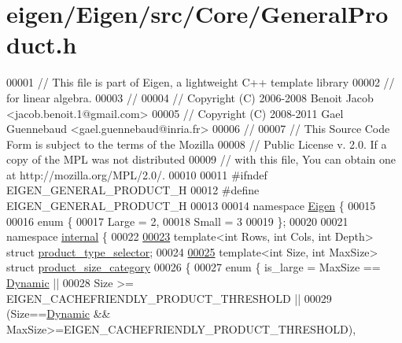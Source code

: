 \hypertarget{eigen_2_eigen_2src_2_core_2_general_product_8h_source}{}\section{eigen/\+Eigen/src/\+Core/\+General\+Product.h}
\label{eigen_2_eigen_2src_2_core_2_general_product_8h_source}

\begin{DoxyCode}
00001 \textcolor{comment}{// This file is part of Eigen, a lightweight C++ template library}
00002 \textcolor{comment}{// for linear algebra.}
00003 \textcolor{comment}{//}
00004 \textcolor{comment}{// Copyright (C) 2006-2008 Benoit Jacob <jacob.benoit.1@gmail.com>}
00005 \textcolor{comment}{// Copyright (C) 2008-2011 Gael Guennebaud <gael.guennebaud@inria.fr>}
00006 \textcolor{comment}{//}
00007 \textcolor{comment}{// This Source Code Form is subject to the terms of the Mozilla}
00008 \textcolor{comment}{// Public License v. 2.0. If a copy of the MPL was not distributed}
00009 \textcolor{comment}{// with this file, You can obtain one at http://mozilla.org/MPL/2.0/.}
00010 
00011 \textcolor{preprocessor}{#ifndef EIGEN\_GENERAL\_PRODUCT\_H}
00012 \textcolor{preprocessor}{#define EIGEN\_GENERAL\_PRODUCT\_H}
00013 
00014 \textcolor{keyword}{namespace }\hyperlink{namespace_eigen}{Eigen} \{
00015 
00016 \textcolor{keyword}{enum} \{
00017   Large = 2,
00018   Small = 3
00019 \};
00020 
00021 \textcolor{keyword}{namespace }\hyperlink{namespaceinternal}{internal} \{
00022 
\hyperlink{struct_eigen_1_1internal_1_1product__type__selector}{00023} \textcolor{keyword}{template}<\textcolor{keywordtype}{int} Rows, \textcolor{keywordtype}{int} Cols, \textcolor{keywordtype}{int} Depth> \textcolor{keyword}{struct }\hyperlink{struct_eigen_1_1internal_1_1product__type__selector}{product\_type\_selector};
00024 
\hyperlink{struct_eigen_1_1internal_1_1product__size__category}{00025} \textcolor{keyword}{template}<\textcolor{keywordtype}{int} Size, \textcolor{keywordtype}{int} MaxSize> \textcolor{keyword}{struct }\hyperlink{struct_eigen_1_1internal_1_1product__size__category}{product\_size\_category}
00026 \{
00027   \textcolor{keyword}{enum} \{ is\_large = MaxSize == \hyperlink{namespace_eigen_ad81fa7195215a0ce30017dfac309f0b2}{Dynamic} ||
00028                     Size >= EIGEN\_CACHEFRIENDLY\_PRODUCT\_THRESHOLD ||
00029                     (Size==\hyperlink{namespace_eigen_ad81fa7195215a0ce30017dfac309f0b2}{Dynamic} && MaxSize>=EIGEN\_CACHEFRIENDLY\_PRODUCT\_THRESHOLD),

\end{DoxyCode}
